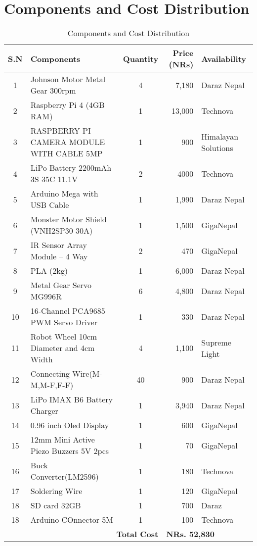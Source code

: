 \section*{Components and Cost Distribution}

\begin{table}[h]
\centering
\begin{tabular}{|c|l|c|r|l|}
\hline
\textbf{S.N} & \textbf{Components} & \textbf{Quantity} & \textbf{Price (NRs)} & \textbf{Availability} \\
\hline
1  & Johnson Motor Metal Gear 300rpm                 & 4 & 7,180  & Daraz Nepal \\
\hline
2  & Raspberry Pi 4 (4GB RAM)                       & 1 & 13,000 & Technova \\
\hline
3  & RASPBERRY PI CAMERA MODULE WITH CABLE 5MP       & 1 & 900 & Himalayan Solutions \\
\hline
4  & LiPo Battery 2200mAh 3S 35C 11.1V               & 2 & 4000  & Technova \\
\hline
5  & Arduino Mega with USB Cable                     & 1 & 1,990  & Daraz Nepal \\
\hline
6  & Monster Motor Shield (VNH2SP30 30A)             & 1 & 1,500  & GigaNepal \\
\hline
7  & IR Sensor Array Module – 4 Way                   & 2 & 470    & GigaNepal \\
\hline
8  & PLA (2kg)                                        & 1 & 6,000  & Daraz Nepal \\
\hline
9  & Metal Gear Servo MG996R                         & 6 & 4,800  & Daraz Nepal \\
\hline
10  & 16-Channel PCA9685 PWM Servo Driver             & 1 & 330    & Daraz Nepal \\
\hline
11 & Robot Wheel 10cm Diameter and 4cm Width      & 4 & 1,100  & Supreme Light \\
\hline
12 & Connecting Wire(M-M,M-F,F-F)                                  & 40 & 900    & Daraz Nepal \\
\hline
13 & LiPo IMAX B6 Battery Charger                    & 1 & 3,940  & Daraz Nepal \\
\hline
14 & 0.96 inch Oled Display                         & 1 & 600  & GigaNepal \\
\hline
15 & 12mm Mini Active Piezo Buzzers 5V 2pcs       & 1 & 70  & GigaNepal \\
\hline
16 & Buck Converter(LM2596)                             & 1 & 180  & Technova \\
\hline
17 & Soldering Wire                        & 1 & 120  & GigaNepal \\
\hline
18 & SD card 32GB                        & 1 & 700  & Daraz \\
\hline
18 & Arduino COnnector 5M                 & 1 & 100 & Technova \\
\hline
\multicolumn{3}{|r|}{\textbf{Total Cost}} & \multicolumn{2}{l|}{\textbf{NRs. 52,830}} \\
\hline
\end{tabular}
\caption{Components and Cost Distribution}
\end{table}